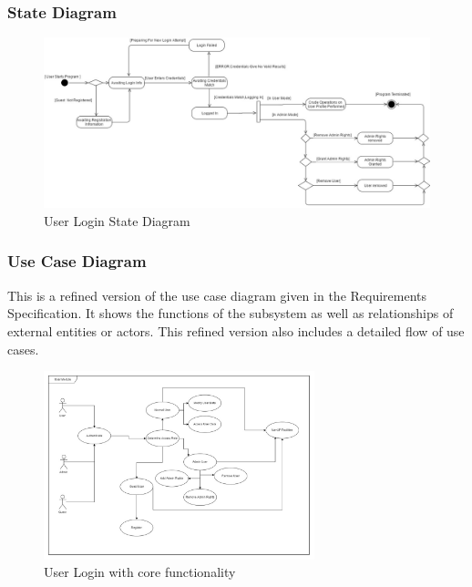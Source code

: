 \subsubsection{State Diagram}

\begin{figure}[H]
		\centering
		\includegraphics[width=\textwidth]{user/img/UserStateDiagram.jpg}
		\caption{User Login State Diagram}
\end{figure}




\subsubsection{Use Case Diagram}
This is a refined version of the use case diagram given in the Requirements Specification. It shows the functions of the subsystem as well as relationships of external entities or actors. This refined version also includes a detailed flow of use cases.
\begin{figure}[H]
		\centering
		\includegraphics[width=0.7\textwidth]{user/img/UserUseCase.jpg}
		\caption{User Login with core functionality }
\end{figure}



